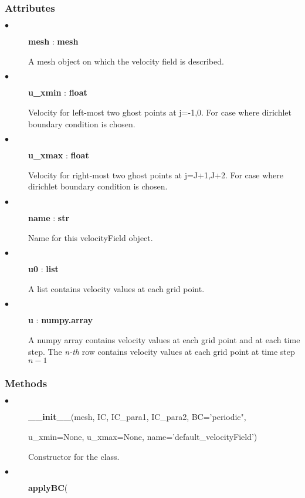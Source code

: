 \documentclass[11pt]{article}
\begin{document}
        \subsubsection{Attributes}
        \begin{description}
            \item[$\bullet$] \textbf{mesh} : \textbf{mesh}
                \par
                A mesh object on which the velocity field is described.
            \item[$\bullet$] \textbf{u\_xmin} : \textbf{float}
                \par
                Velocity for left-most two ghost points at j=-1,0. For case where dirichlet boundary condition is chosen.
            \item[$\bullet$] \textbf{u\_xmax} : \textbf{float}
                \par
                Velocity for right-most two ghost points at j=J+1,J+2. For case where dirichlet boundary condition is chosen.
            \item[$\bullet$] \textbf{name} : \textbf{str}
                \par
                Name for this velocityField object.
            \item[$\bullet$] \textbf{u0} : \textbf{list}
                \par
                A list contains velocity values at each grid point.
            \item[$\bullet$] \textbf{u} : \textbf{numpy.array}
                \par
                A numpy array contains velocity values at each grid point and at each time step.
                The \textit{n-th} row contains velocity values at each grid point at time step $n-1$
                
        \end{description}

        \subsubsection{Methods}
        \begin{description}
            \item[$\bullet$]\textbf{\_\_init\_\_}(mesh, IC, IC\_para1, IC\_para2, BC='periodic",
                \par
                u\_xmin=None, u\_xmax=None, name='default\_velocityField')
                \par
                Constructor for the class. 
            \item[$\bullet$] \textbf{applyBC}(%
                \par
        \end{description}
\end{document}

